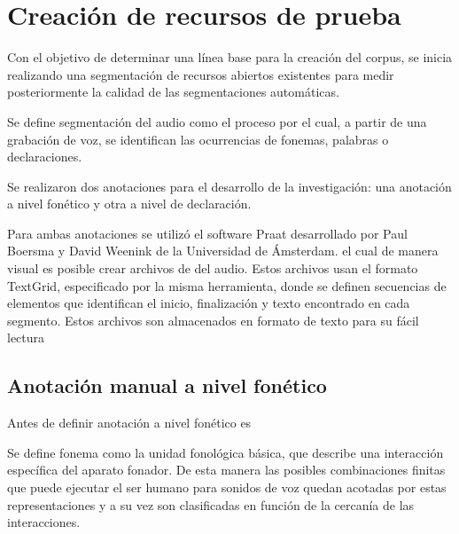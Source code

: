 \chapter{Creación de recursos de prueba}

Con el objetivo de determinar una línea base para la creación del corpus, se inicia realizando una segmentación de recursos abiertos existentes para medir posteriormente la calidad de las segmentaciones automáticas.

Se define segmentación del audio como el proceso por el cual, a partir de una grabación de voz, se identifican las ocurrencias de fonemas, palabras o declaraciones. 

Se realizaron dos anotaciones para el desarrollo de la investigación: una anotación a nivel fonético y otra a nivel de declaración.

Para ambas anotaciones se utilizó el software Praat \cite{Praat} desarrollado por Paul Boersma y David Weenink de la Universidad de Ámsterdam. el cual de manera visual es posible crear archivos de  del audio. Estos archivos usan el formato TextGrid, especificado por la misma herramienta, donde se definen secuencias de elementos que identifican el inicio, finalización y texto encontrado en cada segmento. Estos archivos son almacenados en formato de texto para su fácil lectura \cite{TextGrids}

\section{Anotación manual a nivel fonético}

Antes de definir  anotación a nivel fonético es 

Se define fonema como la unidad fonológica básica, que describe una interacción específica del aparato fonador. De esta manera las posibles combinaciones finitas que puede ejecutar el ser humano para  sonidos de voz quedan acotadas por estas representaciones\macb{,} y a su vez son clasificadas en función de la cercanía de las interacciones.

